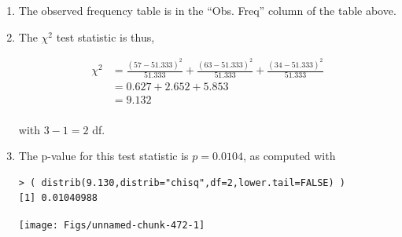 \documentclass[10pt,openany]{book}\usepackage[]{graphicx}\usepackage[]{color}
\makeatletter
\newenvironment{kframe}{%
 \def\at@end@of@kframe{}%
 \ifinner\ifhmode%
  \def\at@end@of@kframe{\end{minipage}}%
  \begin{minipage}{\columnwidth}%
 \fi\fi%
 \def\FrameCommand##1{\hskip\@totalleftmargin \hskip-\fboxsep
 \colorbox{shadecolor}{##1}\hskip-\fboxsep
     \hskip-\linewidth \hskip-\@totalleftmargin \hskip\columnwidth}%
 \MakeFramed {\advance\hsize-\width
   \@totalleftmargin\z@ \linewidth\hsize
   \@setminipage}}%
 {\par\unskip\endMakeFramed%
 \at@end@of@kframe}
\newenvironment{knitrout}{}{} %
\makeatother
\begin{document}
\begin{itemize}
\begin{enumerate}
\begin{center}
        \end{center}
    \item The observed frequency table is in the ``Obs. Freq'' column of the table above.
    \item The $\chi^{2}$ test statistic is thus,
      \begin{center}
        \[  \begin{split}
          \chi^{2} &= \frac{(57-51.333)^{2}}{51.333} + \frac{(63-51.333)^{2}}{51.333} + \frac{(34-51.333)^{2}}{51.333} \\
          &= 0.627 + 2.652 + 5.853 \\
          & = 9.132 \\
        \end{split}  \]
      \end{center}
      with $3-1=2$ df.
    \item The p-value for this test statistic is $p=0.0104$, as computed with
\begin{knitrout}
\color{fgcolor}\begin{kframe}
\begin{verbatim}
> ( distrib(9.130,distrib="chisq",df=2,lower.tail=FALSE) )
[1] 0.01040988
\end{verbatim}
\end{kframe}

{\centering \texttt{[image: Figs/unnamed-chunk-472-1]} 

}




\end{knitrout}
\end{enumerate}
\end{itemize}
\end{document}
